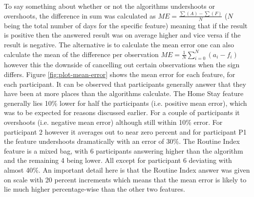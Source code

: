 To say something about whether or not the algorithms undershoots or overshoots, the difference in sum was calculated as $ME = \frac{\sum(A) - \sum(F)}{N}$ ($N$ being the total number of days for the specific feature) meaning that if the result is positive then the answered result was on average higher and vice versa if the result is negative. The alternative is to calculate the mean error one can also calculate the mean of the difference per observation $ME = \frac{1}{N} \sum_{i=0}^{N} (a_i - f_i)$ however this the downside of cancelling out certain observations when the sign differs. Figure \ref{fig:plot-mean-error} shows the mean error for each feature, for each participant. It can be observed that participants generally answer that they have been at more places than the algorithms calculate. The Home Stay feature generally lies 10\% lower for half the participants (i.e. positive mean error), which was to be expected for reasons discussed earlier. For a couple of participants it overshoots (i.e. negative mean error) although still within 10\% error. For participant 2 however it averages out to near zero percent and for participant P1 the feature undershoots dramatically with an error of 30\%. The Routine Index feature is a mixed bag, with 6 participants answering higher than the algorithm and the remaining 4 being lower. All except for participant 6 deviating with almost 40\%. An important detail here is that the Routine Index answer was given on  scale with 20 percent increments which means that the mean error is likely to lie much higher percentage-wise than the other two features.

